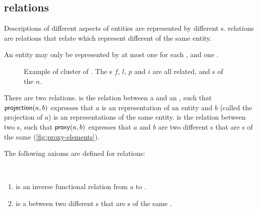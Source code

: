 \subsection{ relations}
\label{sec:owasp-relat}


Descriptions of different aspects of entities are represented by
different s.
%
 relations are relations that relate
 which represent different  of the same
entity.

An entity may only be represented by at most one 
for each , and one .

\begin{figure}
  \centering
  \caption{Example of cluster of  . The
    s $f$, $l$, $p$ and $i$ are all  related, and
    s of the  $n$.}
  \label{fig:proxy-elements}
\end{figure}

There are two  relations.
%
 is the relation between a  and an
, such that $\textsf{projection}(a,b)$ expresses that
$a$ is an  representation of an entity and $b$
(called the projection of $a$) is an 
representations of the same entity.   is the relation
between two s, such that $\textsf{proxy}(a,b)$ expresses
that $a$ and $b$ are two different s that are
s of the same  (\autoref{fig:proxy-elements}).


The following axioms are defined for  relations:
\begin{axioms}~
  \begin{enumerate}[resume=axioms,{label=(\arabic*)}]
  \item {} is an inverse functional
     relation from a  to
    .
  \item {} is a  between two different
    s that are s of the same
    .
  \end{enumerate}
\end{axioms}

